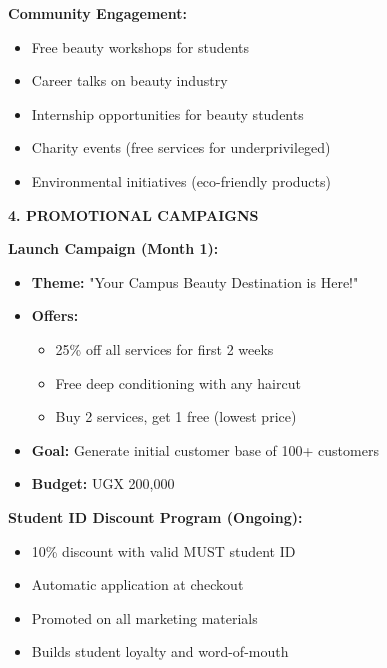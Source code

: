 \textbf{Community Engagement:}
\begin{itemize}[leftmargin=2em]
    \item Free beauty workshops for students
    \item Career talks on beauty industry
    \item Internship opportunities for beauty students
    \item Charity events (free services for underprivileged)
    \item Environmental initiatives (eco-friendly products)
\end{itemize}

\vspace{1em}

\textbf{4. PROMOTIONAL CAMPAIGNS}

\textbf{Launch Campaign (Month 1):}
\begin{itemize}[leftmargin=2em]
    \item \textbf{Theme:} "Your Campus Beauty Destination is Here!"
    \item \textbf{Offers:}
    \begin{itemize}
        \item 25\% off all services for first 2 weeks
        \item Free deep conditioning with any haircut
        \item Buy 2 services, get 1 free (lowest price)
    \end{itemize}
    \item \textbf{Goal:} Generate initial customer base of 100+ customers
    \item \textbf{Budget:} UGX 200,000
\end{itemize}

\textbf{Student ID Discount Program (Ongoing):}
\begin{itemize}[leftmargin=2em]
    \item 10\% discount with valid MUST student ID
    \item Automatic application at checkout
    \item Promoted on all marketing materials
    \item Builds student loyalty and word-of-mouth
\end{itemize}

